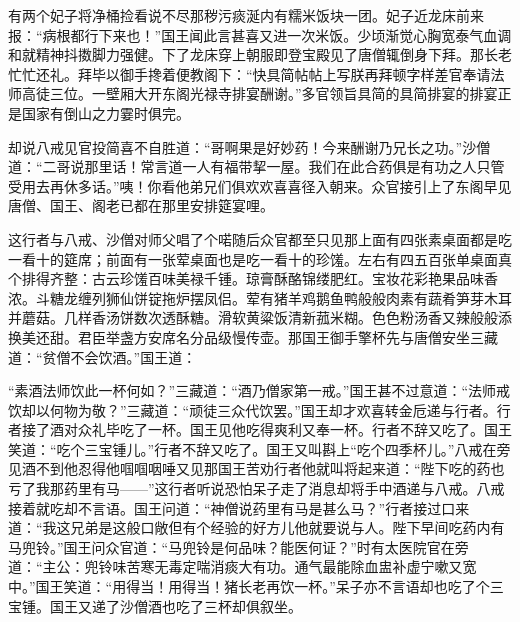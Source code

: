 \documentclass[12pt,UTF8]{ctexbook}
\begin{document}
有两个妃子将净桶捡看说不尽那秽污痰涎内有糯米饭块一团。妃子近龙床前来报：“病根都行下来也！”国王闻此言甚喜又进一次米饭。少顷渐觉心胸宽泰气血调和就精神抖擞脚力强健。下了龙床穿上朝服即登宝殿见了唐僧辄倒身下拜。那长老忙忙还礼。拜毕以御手搀着便教阁下：“快具简帖帖上写朕再拜顿字样差官奉请法师高徒三位。一壁厢大开东阁光禄寺排宴酬谢。”多官领旨具简的具简排宴的排宴正是国家有倒山之力霎时俱完。

却说八戒见官投简喜不自胜道：“哥啊果是好妙药！今来酬谢乃兄长之功。”沙僧道：“二哥说那里话！常言道一人有福带挈一屋。我们在此合药俱是有功之人只管受用去再休多话。”咦！你看他弟兄们俱欢欢喜喜径入朝来。众官接引上了东阁早见唐僧、国王、阁老已都在那里安排筵宴哩。

这行者与八戒、沙僧对师父唱了个喏随后众官都至只见那上面有四张素桌面都是吃一看十的筵席；前面有一张荤桌面也是吃一看十的珍馐。左右有四五百张单桌面真个排得齐整：古云珍馐百味美禄千锺。琼膏酥酪锦缕肥红。宝妆花彩艳果品味香浓。斗糖龙缠列狮仙饼锭拖炉摆凤侣。荤有猪羊鸡鹅鱼鸭般般肉素有蔬肴笋芽木耳并蘑菇。几样香汤饼数次透酥糖。滑软黄粱饭清新菰米糊。色色粉汤香又辣般般添换美还甜。君臣举盏方安席名分品级慢传壶。那国王御手擎杯先与唐僧安坐三藏道：“贫僧不会饮酒。”国王道：

“素酒法师饮此一杯何如？”三藏道：“酒乃僧家第一戒。”国王甚不过意道：“法师戒饮却以何物为敬？”三藏道：“顽徒三众代饮罢。”国王却才欢喜转金卮递与行者。行者接了酒对众礼毕吃了一杯。国王见他吃得爽利又奉一杯。行者不辞又吃了。国王笑道：“吃个三宝锺儿。”行者不辞又吃了。国王又叫斟上“吃个四季杯儿。”八戒在旁见酒不到他忍得他啯啯咽唾又见那国王苦劝行者他就叫将起来道：“陛下吃的药也亏了我那药里有马——”这行者听说恐怕呆子走了消息却将手中酒递与八戒。八戒接着就吃却不言语。国王问道：“神僧说药里有马是甚么马？”行者接过口来道：“我这兄弟是这般口敞但有个经验的好方儿他就要说与人。陛下早间吃药内有马兜铃。”国王问众官道：“马兜铃是何品味？能医何证？”时有太医院官在旁道：“主公：兜铃味苦寒无毒定喘消痰大有功。通气最能除血盅补虚宁嗽又宽中。”国王笑道：“用得当！用得当！猪长老再饮一杯。”呆子亦不言语却也吃了个三宝锺。国王又递了沙僧酒也吃了三杯却俱叙坐。
\end{document}
